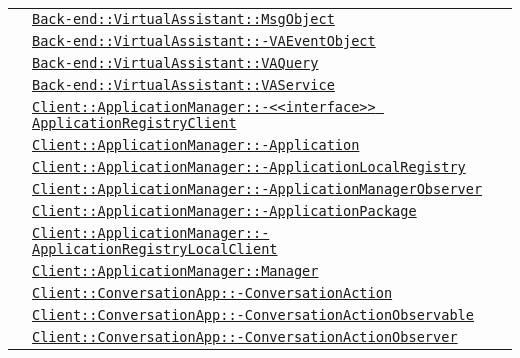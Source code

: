 \begin{longtable}{|>{\centering}m{3cm}|m{10cm}<{\centering}|}
& \hyperref[Back-end::VirtualAssistant::MsgObject]{\texttt{Back-end::VirtualAssistant::MsgObject}}\\
& \hyperref[Back-end::VirtualAssistant::VAEventObject]{\texttt{Back-end::VirtualAssistant::-\linebreak VAEventObject}}\\
& \hyperref[Back-end::VirtualAssistant::VAQuery]{\texttt{Back-end::VirtualAssistant::VAQuery}}\\
& \hyperref[Back-end::VirtualAssistant::VAService]{\texttt{Back-end::VirtualAssistant::VAService}}\\
& \hyperref[Client::ApplicationManager::<<interface>> ApplicationRegistryClient]{\texttt{Client::ApplicationManager::-\linebreak <<interface>> ApplicationRegistryClient}}\\
& \hyperref[Client::ApplicationManager::Application]{\texttt{Client::ApplicationManager::-\linebreak Application}}\\
& \hyperref[Client::ApplicationManager::ApplicationLocalRegistry]{\texttt{Client::ApplicationManager::-\linebreak ApplicationLocalRegistry}}\\
& \hyperref[Client::ApplicationManager::ApplicationManagerObserver]{\texttt{Client::ApplicationManager::-\linebreak ApplicationManagerObserver}}\\
& \hyperref[Client::ApplicationManager::ApplicationPackage]{\texttt{Client::ApplicationManager::-\linebreak ApplicationPackage}}\\
& \hyperref[Client::ApplicationManager::ApplicationRegistryLocalClient]{\texttt{Client::ApplicationManager::-\linebreak ApplicationRegistryLocalClient}}\\
& \hyperref[Client::ApplicationManager::Manager]{\texttt{Client::ApplicationManager::Manager}}\\
& \hyperref[Client::ConversationApp::ConversationAction]{\texttt{Client::ConversationApp::-\linebreak ConversationAction}}\\
& \hyperref[Client::ConversationApp::ConversationActionObservable]{\texttt{Client::ConversationApp::-\linebreak ConversationActionObservable}}\\
& \hyperref[Client::ConversationApp::ConversationActionObserver]{\texttt{Client::ConversationApp::-\linebreak ConversationActionObserver}}\\

\end{longtable}
